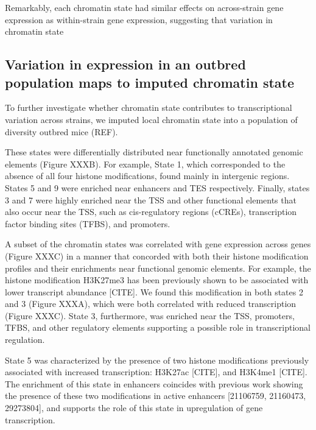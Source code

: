 \documentclass[10pt,letterpaper]{article}
\begin{document}
Remarkably, each chromatin state had similar effects on across-strain
gene expression as within-strain gene expression, suggesting that
variation in chromatin state

\hypertarget{variation-in-expression-in-an-outbred-population-maps-to-imputed-chromatin-state}{%
\subsection{Variation in expression in an outbred population maps to
imputed chromatin
state}\label{variation-in-expression-in-an-outbred-population-maps-to-imputed-chromatin-state}}

To further investigate whether chromatin state contributes to
transcriptional variation across strains, we imputed local chromatin
state into a population of diversity outbred mice (REF).

These states were differentially distributed near functionally annotated
genomic elements (Figure XXXB). For example, State 1, which corresponded
to the absence of all four histone modifications, found mainly in
intergenic regions. States 5 and 9 were enriched near enhancers and TES
respectively. Finally, states 3 and 7 were highly enriched near the TSS
and other functional elements that also occur near the TSS, such as
cis-regulatory regions (cCREs), transcription factor binding sites
(TFBS), and promoters.

A subset of the chromatin states was correlated with gene expression
across genes (Figure XXXC) in a manner that concorded with both their
histone modification profiles and their enrichments near functional
genomic elements. For example, the histone modification H3K27me3 has
been previously shown to be associated with lower transcript abundance
{[}CITE{]}. We found this modification in both states 2 and 3 (Figure
XXXA), which were both correlated with reduced transcription (Figure
XXXC). State 3, furthermore, was enriched near the TSS, promoters, TFBS,
and other regulatory elements supporting a possible role in
transcriptional regulation.

State 5 was characterized by the presence of two histone modifications
previously associated with increased transcription: H3K27ac {[}CITE{]},
and H3K4me1 {[}CITE{]}. The enrichment of this state in enhancers
coincides with previous work showing the presence of these two
modifications in active enhancers {[}21106759, 21160473, 29273804{]},
and supports the role of this state in upregulation of gene
transcription.
\end{document}
